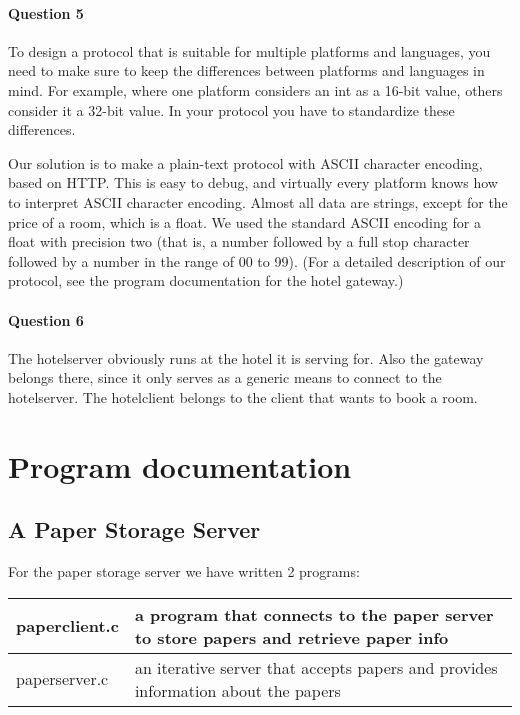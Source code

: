 \documentclass[a4paper,10pt]{article}
\begin{document}
\paragraph{Question 5}
To design a protocol that is suitable for multiple platforms and languages, you need to make sure to keep the differences between platforms and languages in mind. For example, where one platform considers an int as a 16-bit value, others consider it a 32-bit value. In your protocol you have to standardize these differences.

Our solution is to make a plain-text protocol with ASCII character encoding, based on HTTP. This is easy to debug, and virtually every platform knows how to interpret ASCII character encoding. Almost all data are strings, except for the price of a room, which is a float. We used the standard ASCII encoding for a float with precision two (that is, a number followed by a full stop character followed by a number in the range of 00 to 99). (For a detailed description of our protocol, see the program documentation for the hotel gateway.)

\paragraph{Question 6}
The hotelserver obviously runs at the hotel it is serving for. Also the gateway belongs there, since it only serves as a generic means to connect to the hotelserver. The hotelclient belongs to the client that wants to book a room.

\section{Program documentation}
\subsection{A Paper Storage Server}

For the paper storage server we have written 2 programs:
\begin{center}
\begin{tabular}{ l | p{9cm} }
paperclient.c & a program that connects to the paper server to store papers and retrieve paper info\\ \hline
paperserver.c & an iterative server that accepts papers and provides information about the papers\\
\end{tabular}
\end{center}
\end{document}
